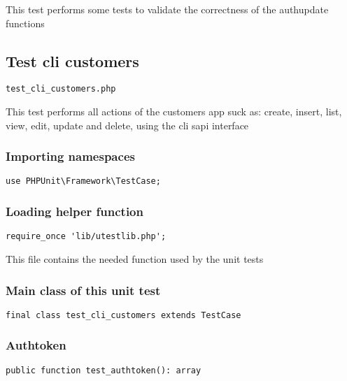 \documentclass[a4paper]{article}
\begin{document}
This test performs some tests to validate the correctness
of the authupdate functions

\hypertarget{toc51}{}
\subsection{Test cli customers}

\begin{lstlisting}
test_cli_customers.php
\end{lstlisting}

This test performs all actions of the customers app suck as: create, insert,
list, view, edit, update and delete, using the cli sapi interface

\hypertarget{toc52}{}
\subsubsection{Importing namespaces}

\begin{lstlisting}
use PHPUnit\Framework\TestCase;
\end{lstlisting}

\hypertarget{toc53}{}
\subsubsection{Loading helper function}

\begin{lstlisting}
require_once 'lib/utestlib.php';
\end{lstlisting}

This file contains the needed function used by the unit tests

\hypertarget{toc54}{}
\subsubsection{Main class of this unit test}

\begin{lstlisting}
final class test_cli_customers extends TestCase
\end{lstlisting}

\hypertarget{toc55}{}
\subsubsection{Authtoken}

\begin{lstlisting}
public function test_authtoken(): array
\end{lstlisting}
\end{document}
